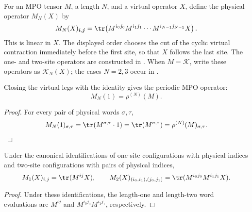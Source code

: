 \begin{definition}
    \label{def:phys_close}
    \leanok
    For an MPO tensor $M$, a length $N$, and a virtual operator $X$, define the
    physical operator $M_N(X)$ by
    \[
        M_N(X)_{\boldsymbol i,\boldsymbol j}
        =
        \tr\!\left(
          M^{i_0j_0} M^{i_1j_1}\cdots M^{i_{N-1}j_{N-1}} X
        \right).
    \]
    This is linear in $X$. The displayed order chooses the cut of the cyclic
    virtual contraction immediately before the first site, so that $X$ follows
    the last site. The one- and two-site operators are constructed in
    \cite[lines~638--654 and Definition~4.1]{Cirac2016MPDO_arXiv}. When
    $M=\mathcal K$, write these operators as $\mathcal K_N(X)$; the cases
    $N=2,3$ occur in
    \cite[Proposition~C.7, lines~1510--1516]{Cirac2016MPDO_arXiv}.
\end{definition}

\begin{lemma}
    \label{lem:phys_close_identity}
    \leanok
    Closing the virtual legs with the identity gives the periodic MPO
    operator:
    \[
        M_N(1)=\rho^{(N)}(M).
    \]
\end{lemma}

\begin{proof}
    \leanok
    For every pair of physical words $\sigma,\tau$,
    \[
        M_N(1)_{\sigma,\tau}
          = \tr\!\left(M^{\sigma,\tau}\cdot 1\right)
          = \tr\!\left(M^{\sigma,\tau}\right)
          = \rho^{(N)}(M)_{\sigma,\tau}. \qedhere
    \]
\end{proof}

\begin{theorem}
    \label{thm:phys_close_one_two}
    \leanok
    Under the canonical identifications of one-site configurations with
    physical indices and two-site configurations with pairs of physical
    indices,
    \[
        M_1(X)_{i,j}=\tr(M^{ij} X),
        \qquad
        M_2(X)_{(i_0,i_1),(j_0,j_1)}
        =\tr(M^{i_0j_0} M^{i_1j_1} X).
    \]
\end{theorem}
\begin{proof}
    \leanok
    Under these identifications, the length-one and length-two word
    evaluations are $M^{ij}$ and $M^{i_0j_0}M^{i_1j_1}$, respectively.
\end{proof}

